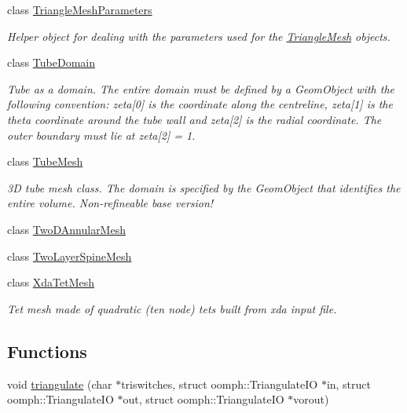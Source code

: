 \begin{DoxyCompactItemize}
\item 
class \hyperlink{classoomph_1_1TriangleMeshParameters}{Triangle\+Mesh\+Parameters}
\begin{DoxyCompactList}\small\item\em Helper object for dealing with the parameters used for the \hyperlink{classoomph_1_1TriangleMesh}{Triangle\+Mesh} objects. \end{DoxyCompactList}\item 
class \hyperlink{classoomph_1_1TubeDomain}{Tube\+Domain}
\begin{DoxyCompactList}\small\item\em Tube as a domain. The entire domain must be defined by a Geom\+Object with the following convention\+: zeta\mbox{[}0\mbox{]} is the coordinate along the centreline, zeta\mbox{[}1\mbox{]} is the theta coordinate around the tube wall and zeta\mbox{[}2\mbox{]} is the radial coordinate. The outer boundary must lie at zeta\mbox{[}2\mbox{]} = 1. \end{DoxyCompactList}\item 
class \hyperlink{classoomph_1_1TubeMesh}{Tube\+Mesh}
\begin{DoxyCompactList}\small\item\em 3D tube mesh class. The domain is specified by the Geom\+Object that identifies the entire volume. Non-\/refineable base version! \end{DoxyCompactList}\item 
class \hyperlink{classoomph_1_1TwoDAnnularMesh}{Two\+D\+Annular\+Mesh}
\item 
class \hyperlink{classoomph_1_1TwoLayerSpineMesh}{Two\+Layer\+Spine\+Mesh}
\item 
class \hyperlink{classoomph_1_1XdaTetMesh}{Xda\+Tet\+Mesh}
\begin{DoxyCompactList}\small\item\em Tet mesh made of quadratic (ten node) tets built from xda input file. \end{DoxyCompactList}\end{DoxyCompactItemize}
\subsection*{Functions}
\begin{DoxyCompactItemize}
\item 
void \hyperlink{namespaceoomph_a3af531b221ad8fe56e4f9e3364435b87}{triangulate} (char $\ast$triswitches, struct oomph\+::\+Triangulate\+IO $\ast$in, struct oomph\+::\+Triangulate\+IO $\ast$out, struct oomph\+::\+Triangulate\+IO $\ast$vorout)
\end{DoxyCompactItemize}
